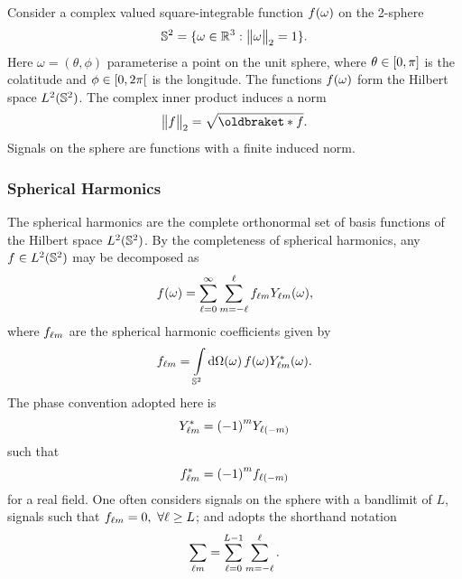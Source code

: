 Consider a complex valued square-integrable function \(f(\omega)\) on the 2-sphere
%
\begin{equation}
	\mathbb{S}^{2}{}
	= \{\omega \in \mathbb{R}^{3} : {\big\lVert\omega\big\rVert}_{2} = 1\}.
\end{equation}
%
Here \(\omega=(\theta,\phi)\) parameterise a point on the unit sphere, where \(\theta \in \interval{0}{\pi}\) is the colatitude and \(\phi \in \interval[open right]{0}{2\pi}\) is the longitude.
The functions \(f(\omega)\) form the Hilbert space \(L^{2}(\mathbb{S}^{2})\).
The complex inner product induces a norm
%
\begin{equation}
	\norm{f}
	= \sqrt{\braket{f}}.
\end{equation}
%
Signals on the sphere are functions with a finite induced norm.

\subsubsection{Spherical Harmonics}

The spherical harmonics are the complete orthonormal set of basis functions of the Hilbert space \(L^{2}(\mathbb{S}^{2})\).
By the completeness of spherical harmonics, any \(f \in L^{2}(\mathbb{S}^{2})\) may be decomposed as
%
\begin{equation}
	f(\omega)
	= \sum\limits_{\ell=0}^{\infty} \sum\limits_{m=-\ell}^{\ell} {f}_{\ell m} {Y}_{\ell m}(\omega),
\end{equation}
%
where \({f}_{\ell m}\) are the spherical harmonic coefficients given by
%
\begin{equation}
	{f}_{\ell m}
	= \int\limits_{\mathbb{S}^{2}} \dd{\Omega(\omega)} f(\omega) {Y}_{\ell m}^{\ast}(\omega).
\end{equation}
%
The phase convention adopted here is
%
\begin{equation}
	{Y}_{\ell m}^{\ast}
	= {(-1)}^{m} Y_{\ell(-m)}
\end{equation}
%
such that
%
\begin{equation}
	{f}_{\ell m}^{\ast}
	= {(-1)}^{m} f_{\ell(-m)}
\end{equation}
%
for a real field.
One often considers signals on the sphere with a bandlimit of \(L\), \ie{} signals such that \({f}_{\ell m} = 0,\ \forall \ell \geq L\); and adopts the shorthand notation
%
\begin{equation}
	\sum\limits_{\ell m}
	= \sum\limits_{\ell=0}^{L-1} \sum\limits_{m=-\ell}^{\ell}.
\end{equation}

